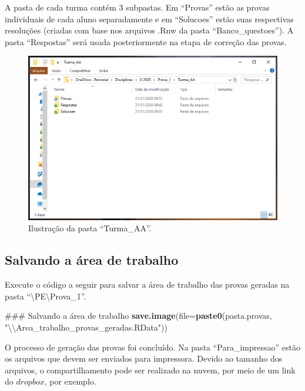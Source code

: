 \documentclass[a4paper]{report}
\newenvironment{Shaded}{\begin{snugshade}}{\end{snugshade}}
\newcommand{\KeywordTok}[1]{\textcolor[rgb]{0.13,0.29,0.53}{\textbf{#1}}}
\newcommand{\DataTypeTok}[1]{\textcolor[rgb]{0.13,0.29,0.53}{#1}}
\newcommand{\CharTok}[1]{\textcolor[rgb]{0.31,0.60,0.02}{#1}}
\newcommand{\StringTok}[1]{\textcolor[rgb]{0.31,0.60,0.02}{#1}}
\newcommand{\NormalTok}[1]{#1}
\begin{document}
A pasta de cada turma contém 3 subpastas. Em ``Provas'' estão as provas
individuais de cada aluno separadamente e em ``Solucoes'' estão suas
respectivas resoluções (criadas com base nos arquivos .Rnw da pasta
``Banco\_questoes''). A pasta ``Respostas'' será usada posteriormente na
etapa de correção das provas.

\begin{figure}
\centering
\includegraphics{imagens/pasta_turma.png}
\caption{Ilustração da pasta ``Turma\_AA''.}
\end{figure}

\subsection{Salvando a área de trabalho}

Execute o código a seguir para salvar a área de trabalho das provas
geradas na pasta ``\textbackslash{}PE\textbackslash{}Prova\_1''.

\begin{Shaded}
\begin{Highlighting}[]
\NormalTok{### Salvando a área de trabalho}
\KeywordTok{save.image}\NormalTok{(}\DataTypeTok{file=}\KeywordTok{paste0}\NormalTok{(pasta.provas, }\StringTok{"}\CharTok{\textbackslash{}\textbackslash{}}\StringTok{Area_trabalho_provas_geradas.RData"}\NormalTok{))}
\end{Highlighting}
\end{Shaded}

O processo de geração das provas foi concluído. Na pasta
``Para\_impressao'' estão os arquivos que devem ser enviados para
impressora. Devido ao tamanho dos arquivos, o compartilhamento pode ser
realizado na nuvem, por meio de um link do \(dropbox\), por exemplo.
\end{document}
